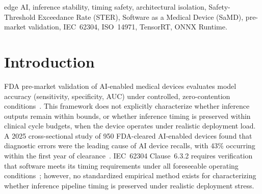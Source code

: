 \documentclass[journal,10pt,twocolumn]{IEEEtran}
\begin{document}
\begin{IEEEkeywords}
edge AI, inference stability, timing safety, architectural isolation,
Safety-Threshold Exceedance Rate (STER), Software as a Medical Device
(SaMD), pre-market validation, IEC~62304, ISO~14971, TensorRT,
ONNX Runtime.
\end{IEEEkeywords}

\section{Introduction}

FDA pre-market validation of AI-enabled medical devices evaluates model
accuracy (sensitivity, specificity, AUC) under controlled,
zero-contention conditions~\cite{fda_draft_guidance}.
This framework does not explicitly characterize whether inference outputs
remain within bounds, or whether inference timing is preserved within
clinical cycle budgets, when the device operates under realistic
deployment load.
A 2025 cross-sectional study of 950 FDA-cleared AI-enabled devices found
that diagnostic errors were the leading cause of AI device recalls, with
43\% occurring within the first year of clearance~\cite{lee2025recalls}.
IEC~62304 Clause~6.3.2 requires verification that software meets its
timing requirements under all foreseeable operating conditions~\cite{iec62304};
however, no standardized empirical method exists for characterizing
whether inference pipeline timing is preserved under realistic deployment
stress.
\end{document}
